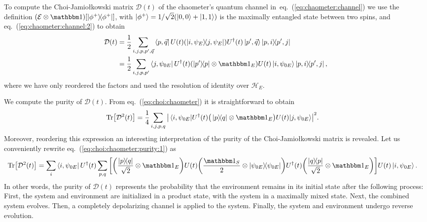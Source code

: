\documentclass[10pt,letterpaper]{article}
\newcommand{\eref}[1]{eq.~(\ref{#1})}
\newcommand{\mcE}{\mathcal E}
\newcommand{\mcD}{\mathcal D}
\newcommand{\mcH}{\mathcal H}
\newcommand{\jami}{Jamiołkowski}
\begin{document}
To compute the Choi-\jami{} matrix $\mcD(t)$ of the chaometer's quantum channel 
in~\eref{eq:chaometer:channel} we use the definition 
$\qty(\mcE \otimes \one) \qty[\dyad{\phi^+}]$, with $\ket{\phi^+}=1/\sqrt{2}\qty(\ket{0,0} + \ket{1,1})$
is the maximally entangled state between two spins, and \eref{eq:chaometer:channel:2} to obtain
\begin{align}
\mcD(t) &=  
\frac{1}{2} 
\sum_{i, j, p, p', \vec q}
\bra{p, \vec q}
U(t) \qty(\dyad{i,\psi_{E}}{j,\psi_{E}}) U^\dagger(t)
\ket{p', \vec q}
\dyad{p,i}{p',j} \\
&= \label{eq:choi:chaometer:computational:basis}
\frac{1}{2}
\sum_{i, j, p, p'}
\bra{j, \psi_{0E}} U^\dagger(t) \qty( \dyad{p'}{p}\otimes \one_E ) U(t)
\ket{i, \psi_{0E}} \dyad{p, i}{p', j},
\end{align}
where we have only reordered the factors and used the resolution of identity over 
$\mcH_E$.

We compute the purity of $\mcD(t)$. From \eref{eq:choi:chaometer} 
it is straightforward to obtain
\begin{align}\label{eq:choi:chaometer:purity:1}
\Tr[\mcD^2(t)]  &= 
\frac{1}{4}
\sum_{i,j,p,q}
\abs{\matrixel{i, \psi_{0E}}
{U^\dagger(t) \big(\dyad{p}{q} \otimes \one_E\big) U(t)}
{j, \psi_{0E}}
}^2.
\end{align}
Moreover, reordering this expression an interesting interpretation of the purity 
of the Choi-\jami{} matrix is revealed. Let us conveniently rewrite
\eref{eq:choi:chaometer:purity:1} as
\begin{align}\label{eq:choi:chaometer:purity:2}
\Tr[\mcD^2(t)]  &= 
\sum_i
\bra{i, \psi_{0E}}
U^\dagger(t) 
\sum_{p, q} \qty[
\qty(\frac{\dyad{p}{q}}{\sqrt{2}} \otimes \one_E ) 
U(t)
\qty( \frac{\one_S}{2} \otimes \dyad{\psi_{0E}})
U^\dagger(t) 
\qty(\frac{\dyad{q}{p}}{\sqrt{2}} \otimes \one_E ) 
]
U(t)
\ket{i, \psi_{0E}}.
\end{align}
In other words, the purity of $\mcD(t)$ represents the probability that the 
environment remains in its initial state after the following process: First, the system
and environment are initialized in a product state, with the system in a maximally
mixed state. Next, the combined system evolves. Then, a completely depolarizing
channel is applied to the system. Finally, the system and environment undergo 
reverse evolution.
\end{document}
